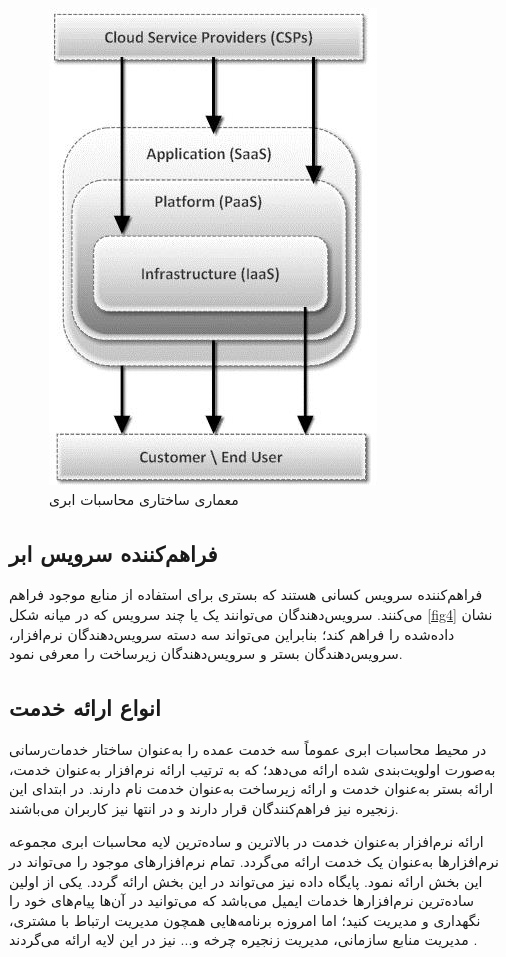 \documentclass[a4paper,oneside,12pt]{report}
\begin{document}
\begin{figure}
\centering
\includegraphics[scale=0.6]{fi2}
\caption{معماری ساختاری محاسبات ابری}\label{fig2}
\end{figure}
\subsection{فراهم‌کننده سرویس ابر}
فراهم‌کننده سرویس کسانی هستند که بستری برای استفاده از منابع موجود فراهم می‌کنند. سرویس‌دهندگان می‌توانند یک یا چند سرویس که در میانه شکل 
\ref{fig4}
نشان داده‌شده را فراهم کند؛ بنابراین می‌تواند سه دسته سرویس‌دهندگان نرم‌افزار، سرویس‌دهندگان بستر و سرویس‌دهندگان زیرساخت را معرفی نمود.
\subsection{انواع ارائه خدمت}
 در محیط محاسبات ابری عموماً سه خدمت عمده را به‌عنوان ساختار خدمات‌رسانی به‌صورت اولویت‌بندی شده ارائه می‌دهد؛ که به ترتیب ارائه نرم‌افزار به‌عنوان خدمت، ارائه بستر به‌عنوان خدمت و ارائه زیرساخت به‌عنوان خدمت نام دارند. در ابتدای این زنجیره نیز فراهم‌کنندگان قرار دارند و در انتها نیز کاربران می‌باشند.  

ارائه نرم‌افزار به‌عنوان خدمت در بالاترین و ساده‌ترین لایه محاسبات ابری مجموعه نرم‌افزارها به‌عنوان یک خدمت ارائه می‌گردد. تمام نرم‌افزارهای موجود را می‌تواند در این بخش ارائه نمود. پایگاه داده نیز می‌تواند در این بخش ارائه گردد. یکی از اولین ساده‌ترین نرم‌افزارها خدمات ایمیل می‌باشد که می‌توانید در آن‌ها پیام‌های خود را نگهداری و مدیریت کنید؛ اما امروزه برنامه‌هایی همچون مدیریت ارتباط با مشتری، مدیریت منابع سازمانی، مدیریت زنجیره چرخه و... نیز در این لایه ارائه می‌گردند
\cite{13}.
\end{document}
